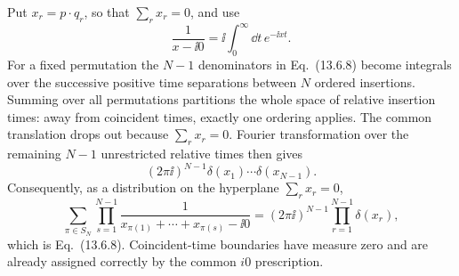 \begin{enumerate}
Put \(x_r=p\cdot q_r\), so that \(\sum_rx_r=0\), and use
\[
 \frac1{x-\ii0}=\ii\int_0^\infty \dd t\,e^{-\ii xt}.
\]
For a fixed permutation the \(N-1\) denominators in Eq.~(13.6.8) become
integrals over the successive positive time separations between \(N\)
ordered insertions.  Summing over all permutations partitions the whole
space of relative insertion times: away from coincident times, exactly one
ordering applies.  The common translation drops out because
\(\sum_rx_r=0\).  Fourier transformation over the remaining \(N-1\)
unrestricted relative times then gives
\[
 (2\pi \ii)^{N-1}\delta(x_1)\cdots\delta(x_{N-1}).
\]
Consequently, as a distribution on the hyperplane \(\sum_rx_r=0\),
\[
 \boxed{\quad
 \sum_{\pi\in S_N}\prod_{s=1}^{N-1}
 \frac1{x_{\pi(1)}+\cdots+x_{\pi(s)}-\ii0}
 =(2\pi \ii)^{N-1}\prod_{r=1}^{N-1}\delta(x_r),
 \quad}
\]
which is Eq.~(13.6.8).  Coincident-time boundaries have measure zero and
are already assigned correctly by the common \(i0\) prescription.
\end{enumerate}
